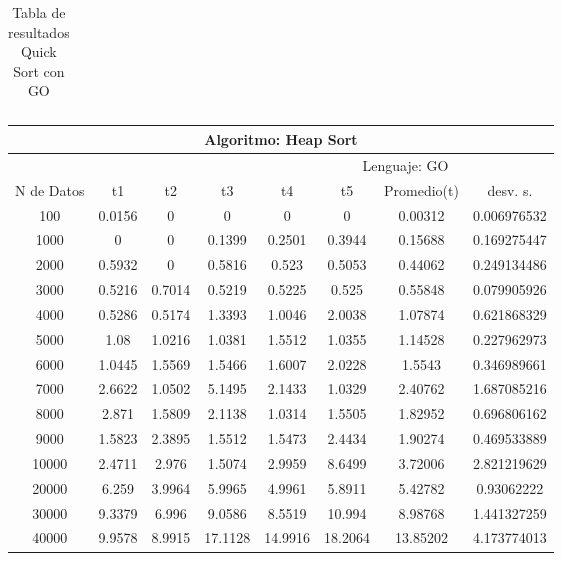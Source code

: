 \documentclass{article}
\begin{document}
\begin{table}[]
\begin{tabular}{|c|c|c|c|c|c|c|c| }
    \end{tabular}
        \caption{Tabla de resultados Quick Sort con GO}
        \label{tab:quickSortC}
    \end{table}

             \begin{table}[]
        \begin{tabular}{|c|c|c|c|c|c|c|c| }
            \hline
            \multicolumn{8}{|c|}{Algoritmo: Heap Sort} \\ \hline
            \multicolumn{4}{|c|}{} & \multicolumn{4}{c|}{Lenguaje: GO} \\ \hline
              N de Datos &     t1    &  t2         &  t3          &   t4        &    t5     &   Promedio(t)       & desv. s. \\ \hline
                100	&0.0156	&0	&0	&0	&0	&0.00312	&0.006976532\\ \hline
                1000	&0	&0	&0.1399	&0.2501	&0.3944	&0.15688	&0.169275447\\ \hline
                2000	&0.5932	&0	&0.5816	&0.523	&0.5053	&0.44062	&0.249134486\\ \hline
                3000	&0.5216	&0.7014	&0.5219	&0.5225	&0.525	&0.55848	&0.079905926\\ \hline
                4000	&0.5286	&0.5174	&1.3393	&1.0046	&2.0038	&1.07874	&0.621868329\\ \hline
                5000	&1.08	&1.0216	&1.0381	&1.5512	&1.0355	&1.14528	&0.227962973\\ \hline
                6000	&1.0445	&1.5569	&1.5466	&1.6007	&2.0228	&1.5543	&0.346989661\\ \hline
                7000	&2.6622	&1.0502	&5.1495	&2.1433	&1.0329	&2.40762	&1.687085216\\ \hline
                8000	&2.871	&1.5809	&2.1138	&1.0314	&1.5505	&1.82952	&0.696806162\\ \hline
                9000	&1.5823	&2.3895	&1.5512	&1.5473	&2.4434	&1.90274	&0.469533889\\ \hline
                10000	&2.4711	&2.976	&1.5074	&2.9959	&8.6499	&3.72006	&2.821219629\\ \hline
                20000	&6.259	&3.9964	&5.9965	&4.9961	&5.8911	&5.42782	&0.93062222\\ \hline
                30000	&9.3379	&6.996	&9.0586	&8.5519	&10.994	&8.98768	&1.441327259\\ \hline
                40000	&9.9578	&8.9915	&17.1128	&14.9916	&18.2064	&13.85202&	4.173774013\\ \hline

\end{tabular}
\end{table}
\end{document}
